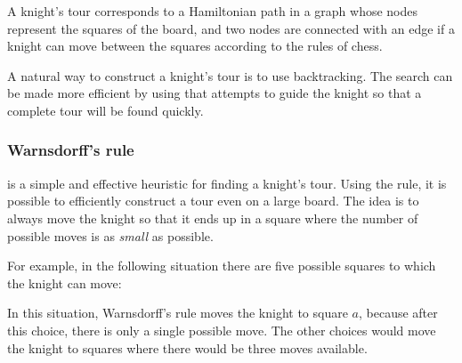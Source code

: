 A knight's tour corresponds to a Hamiltonian path in a graph
whose nodes represent the squares of the board,
and two nodes are connected with an edge if a knight
can move between the squares according to the rules of chess.

A natural way to construct a knight's tour is to use backtracking.
The search can be made more efficient by using
 that attempts to guide the knight so that
a complete tour will be found quickly.

\subsubsection{Warnsdorff's rule}


 is a simple and effective heuristic
for finding a knight's tour.
Using the rule, it is possible to efficiently construct a tour
even on a large board.
The idea is to always move the knight so that it ends up
in a square where the number of possible moves is as
\emph{small} as possible.

For example, in the following situation there are five
possible squares to which the knight can move:
\begin{center}
\end{center}
In this situation, Warnsdorff's rule moves the knight to square $a$,
because after this choice, there is only a single possible move.
The other choices would move the knight to squares where
there would be three moves available.


